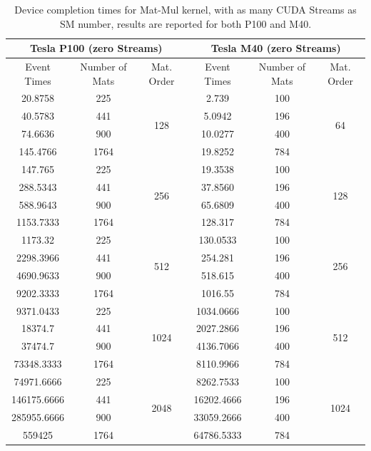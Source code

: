 \begin{table}	
	\centering
	\begin{tabular}{ | c c c  | c c c | } 
		\hline
		\multicolumn{3}{c}{\textbf{Tesla P100 (zero Streams)}} & \multicolumn{3}{c}{\textbf{Tesla M40 (zero Streams)}}\\ [0.5ex]
		\hline\hline
		Event Times  & Number of Mats & Mat. Order & Event Times  & Number of Mats & Mat. Order  \\
		\hline
		
		
		20.8758&	225&	\multirow{4}{*}{128}&	2.739&	100&	\multirow{4}{*}{64}\\
		40.5783&	441&	&	5.0942&	196&	\\
		74.6636&	900&	&	10.0277&	400& \\
		145.4766&	1764&	&	19.8252&	784&	\\
		\hline
		147.765&	225& \multirow{4}{*}{256}&	19.3538&	100&	\multirow{4}{*}{128}\\
		288.5343&	441&	&	37.8560&	196&	\\
		588.9643&	900&	&	65.6809&	400&	\\
		1153.7333&	1764&	&	128.317&	784&	\\
		\hline
		1173.32&	225&\multirow{4}{*}{512}&	130.0533&	100&	\multirow{4}{*}{256}\\
		2298.3966&	441&	&	254.281&	196&	\\
		4690.9633&	900&	&	518.615&	400&	\\
		9202.3333&	1764&	&	1016.55&	784&	\\
		\hline
		9371.0433&	225&	\multirow{4}{*}{1024}&	1034.0666&	100&	\multirow{4}{*}{512}\\
		18374.7&	441&	&	2027.2866&	196&	\\
		37474.7&	900&	&	4136.7066&	400&	\\
		73348.3333&	1764&	&	8110.9966&	784&	\\
		\hline
		74971.6666&	225&	\multirow{4}{*}{2048}&	8262.7533&	100&	\multirow{4}{*}{1024}\\
		146175.6666&	441&	&	16202.4666&	196&	\\
		285955.6666&	900&	&	33059.2666&	400&	\\
		559425&	1764&	&	64786.5333&	784&	\\
		
		\hline
		
		
	\end{tabular}
	\caption{Device completion times for Mat-Mul kernel, with as many CUDA Streams as SM number, results are reported for both P100 and M40.}	
	\label{tab:matvgsSM}		
\end{table}






